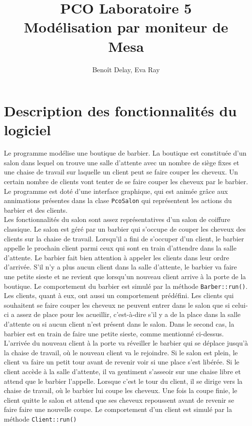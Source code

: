 \documentclass{article}
\title{PCO Laboratoire 5 \\
\large Modélisation par moniteur de Mesa}
\author{Benoît Delay, Eva Ray}
\begin{document}
\maketitle

\section*{Description des fonctionnalités du logiciel}

Le programme modélise une boutique de barbier. La boutique est constituée d'un salon dans lequel on trouve une salle d'attente avec
un nombre de siège fixes et une chaise de travail sur laquelle un client peut se faire couper les cheveux. Un certain nombre de clients
vont tenter de se faire couper les cheveux par le barbier. Le programme est doté d'une interface graphique, qui est animée grâce aux
annimations présentes dans la clase \texttt{PcoSalon} qui représentent les actions du barbier et des clients. \\

Les fonctionnalités du salon sont assez représentatives d'un salon de coiffure classique. Le salon est géré par un barbier qui s'occupe
de couper les cheveux des clients sur la chaise de travail. Lorsqu'il a fini de s'occuper d'un client, le barbier appelle le prochain client
parmi ceux qui sont en train d'attendre dans la salle d'attente. Le barbier fait bien attention à appeler les clients dans leur ordre
d'arrivée. S'il n'y a plus aucun client dans la salle d'attente, le barbier va faire une petite sieste et ne revient que lorsqu'un nouveau
client arrive à la porte de la boutique. Le comportement du barbier est simulé par la méthode \texttt{Barber::run()}. \\

Les clients, quant à eux, ont aussi un comportement prédéfini. Les clients qui souhaitent se faire couper les cheveux ne peuvent entrer
dans le salon que si celui-ci a assez de place pour les acueillir, c'est-à-dire s'il y a de la place dans la salle d'attente ou si aucun
client n'est présent dans le salon. Dans le second cas, la barbier est en train de faire une petite sieste, comme mentionné ci-dessus.
L'arrivée du nouveau client à la porte va réveiller le barbier qui se déplace jusqu'à la chaise de travail, où le nouveau client
va le rejoindre. Si le salon est plein, le
client va faire un petit tour avant de revenir voir si une place s'est libérée. Si le client accède à la salle d'attente, il va gentiment
s'asseoir sur une chaise libre et attend que le barbier l'appelle. Lorsque c'est le tour du client, il se dirige vers la chaise de travail,
où le barbier lui coupe les cheveux. Une fois la coupe finie, le client quitte le salon et attend que ses cheveux repoussent avant de
revenir se faire faire une nouvelle coupe. Le comportement d'un client est simulé par la méthode \texttt{Client::run()} \\
\end{document}
